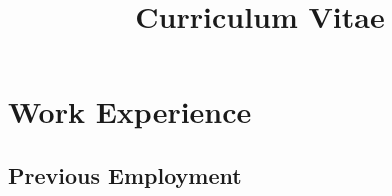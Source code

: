 \documentclass[12pt,a4paper,Times New Roman]{moderncv}        %
\title{Curriculum Vitae}                               %
\begin{document}
\makecvtitle
\thispagestyle{empty}

\section{Work Experience}

\subsection{Previous Employment}

\vspace{2pt}

\begin{itemize}


\end{itemize}
\end{document}
